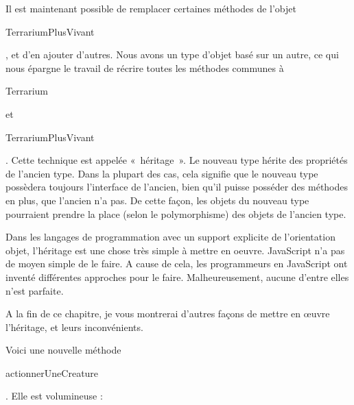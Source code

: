 \documentclass{FramateX}
\renewcommand{\texttt}[1]{\begin{sffamily}{#1}\end{sffamily}}
\begin{document}
Il est maintenant possible de remplacer certaines méthodes de l'objet
\texttt{TerrariumPlusVivant}, et d'en ajouter d'autres. Nous avons un
type d'objet basé sur un autre, ce qui nous épargne le travail de
récrire toutes les méthodes communes à \texttt{Terrarium} et
\texttt{TerrariumPlusVivant}. Cette technique est appelée «~héritage~».
Le nouveau type hérite des propriétés de l'ancien type. Dans la plupart
des cas, cela signifie que le nouveau type possèdera toujours
l'interface de l'ancien, bien qu'il puisse posséder des méthodes en
plus, que l'ancien n'a pas. De cette façon, les objets du nouveau type
pourraient prendre la place (selon le polymorphisme) des objets de
l'ancien type.

Dans les langages de programmation avec un support explicite de
l'orientation objet, l'héritage est une chose très simple à mettre en
oeuvre. JavaScript n'a pas de moyen simple de le faire. A cause de cela,
les programmeurs en JavaScript ont inventé différentes approches pour le
faire. Malheureusement, aucune d'entre elles n'est parfaite.

A la fin de ce chapitre, je vous montrerai d'autres façons de mettre en
œuvre l'héritage, et leurs inconvénients.

\begin{center}\end{center}

Voici une nouvelle méthode \texttt{actionnerUneCreature}. Elle est
volumineuse :
\end{document}
